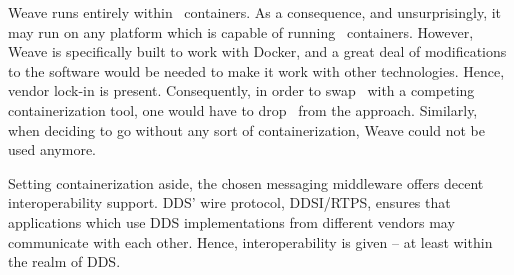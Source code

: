 Weave runs entirely within \docker\ containers. As a consequence, and unsurprisingly, it may run on any platform which is capable of running \docker\ containers. However, Weave is specifically built to work with Docker, and a great deal of modifications to the software would be needed to make it work with other technologies. Hence, vendor lock-in is present. Consequently, in order to swap \docker\ with a competing containerization tool, one would have to drop \wnet\ from the approach. Similarly, when deciding to go without any sort of containerization, Weave could not be used anymore.

Setting containerization aside, the chosen messaging middleware offers decent interoperability support. DDS' wire protocol, DDSI/RTPS, ensures that applications which use DDS implementations from different vendors may communicate with each other. Hence, interoperability is given -- at least within the realm of DDS. 



